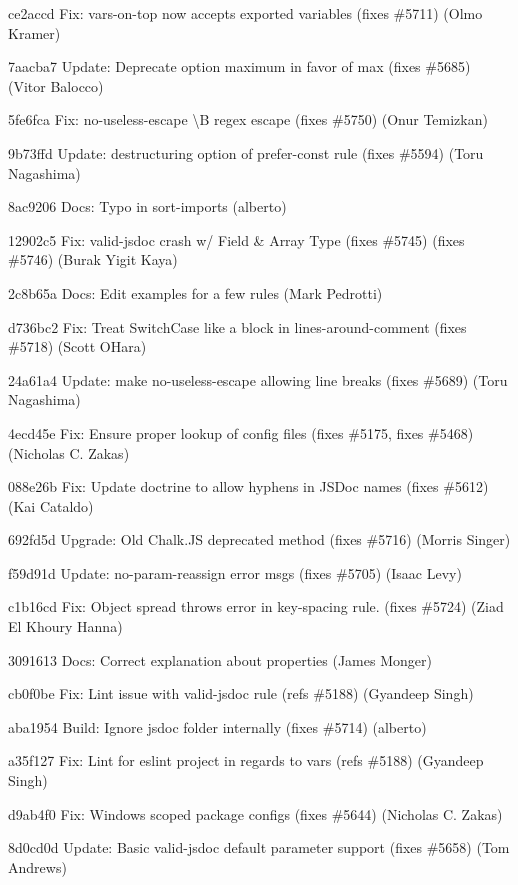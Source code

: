 \begin{DoxyItemize}
\item ce2accd Fix\+: vars-\/on-\/top now accepts exported variables (fixes \#5711) (Olmo Kramer)
\item 7aacba7 Update\+: Deprecate option {\ttfamily maximum} in favor of {\ttfamily max} (fixes \#5685) (Vitor Balocco)
\item 5fe6fca Fix\+: no-\/useless-\/escape \textbackslash{}B regex escape (fixes \#5750) (Onur Temizkan)
\item 9b73ffd Update\+: {\ttfamily destructuring} option of {\ttfamily prefer-\/const} rule (fixes \#5594) (Toru Nagashima)
\item 8ac9206 Docs\+: Typo in {\ttfamily sort-\/imports} (alberto)
\item 12902c5 Fix\+: valid-\/jsdoc crash w/ Field \& Array Type (fixes \#5745) (fixes \#5746) (Burak Yigit Kaya)
\item 2c8b65a Docs\+: Edit examples for a few rules (Mark Pedrotti)
\item d736bc2 Fix\+: Treat Switch\+Case like a block in lines-\/around-\/comment (fixes \#5718) (Scott O\textquotesingle{}Hara)
\item 24a61a4 Update\+: make {\ttfamily no-\/useless-\/escape} allowing line breaks (fixes \#5689) (Toru Nagashima)
\item 4ecd45e Fix\+: Ensure proper lookup of config files (fixes \#5175, fixes \#5468) (Nicholas C. Zakas)
\item 088e26b Fix\+: Update doctrine to allow hyphens in J\+S\+Doc names (fixes \#5612) (Kai Cataldo)
\item 692fd5d Upgrade\+: Old Chalk.\+JS deprecated method (fixes \#5716) (Morris Singer)
\item f59d91d Update\+: no-\/param-\/reassign error msgs (fixes \#5705) (Isaac Levy)
\item c1b16cd Fix\+: Object spread throws error in key-\/spacing rule. (fixes \#5724) (Ziad El Khoury Hanna)
\item 3091613 Docs\+: Correct explanation about properties (James Monger)
\item cb0f0be Fix\+: Lint issue with {\ttfamily valid-\/jsdoc} rule (refs \#5188) (Gyandeep Singh)
\item aba1954 Build\+: Ignore jsdoc folder internally (fixes \#5714) (alberto)
\item a35f127 Fix\+: Lint for eslint project in regards to vars (refs \#5188) (Gyandeep Singh)
\item d9ab4f0 Fix\+: Windows scoped package configs (fixes \#5644) (Nicholas C. Zakas)
\item 8d0cd0d Update\+: Basic valid-\/jsdoc default parameter support (fixes \#5658) (Tom Andrews)
\end{DoxyItemize}

